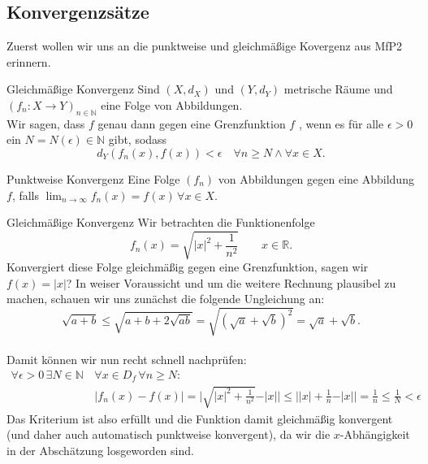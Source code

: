 \subsection{Konvergenzsätze}
Zuerst wollen wir uns an die punktweise und gleichmäßige Kovergenz aus MfP2 erinnern.
\begin{Def}
{Gleichmäßige Konvergenz}
Sind $(X,d_X)$ und $(Y,d_Y)$ metrische Räume und $(f_n:X\to Y)_{n\in\mathbb{N}}$ eine Folge von Abbildungen.\\
Wir sagen, dass $f$ genau dann  gegen eine Grenzfunktion $f$ , wenn es für alle $\epsilon>0$ ein $N=N(\epsilon)\in\mathbb{N}$ gibt, sodass
\begin{equation*}
    d_Y(f_n(x),f(x))<\epsilon\quad \forall n\geq N\land \forall x\in X.
\end{equation*}
\end{Def}
\begin{Def}
{Punktweise Konvergenz}
Eine Folge $(f_n)$ von Abbildungen  gegen eine Abbildung $f$, falls $\lim_{n\to\infty}f_n(x)=f(x)\,\forall x\in X$.
\end{Def}
\begin{Beispiel}
    {Gleichmäßige Konvergenz}
    Wir betrachten die Funktionenfolge
    \begin{equation*}
        f_n(x)=\sqrt{\vert x \vert^2 + \frac{1}{n^2}} \qquad x \in \mathbb{R}.
    \end{equation*}
    Konvergiert diese Folge gleichmäßig gegen eine Grenzfunktion, sagen wir $f(x)=\vert x \vert$? In weiser Voraussicht und um die weitere Rechnung plausibel zu machen, schauen wir uns zunächst die folgende Ungleichung an: 
    \begin{equation*}
        \sqrt{a+b} \leq \sqrt{a+b+2\sqrt{ab}} = \sqrt{(\sqrt{a}+\sqrt{b})^2}=\sqrt{a}+\sqrt{b}.
    \end{equation*} \\
    
    Damit können wir nun recht schnell nachprüfen:
    \begin{align*}
        \forall \epsilon > 0 \,\exists N\in\mathbb{N}\, &\forall x\in D_f \,\forall n\geq N: \\
            &\vert f_n(x)-f(x) \vert = \bigl| \sqrt{\vert x \vert^2 + \frac{1}{n^2}} - \vert x \vert \bigr| \leq \bigl| \vert x \vert + \frac{1}{n} - \vert x \vert \bigr| = \frac{1}{n} \leq \frac{1}{N} < \epsilon
    \end{align*}
    Das Kriterium ist also erfüllt und die Funktion damit gleichmäßig konvergent (und daher auch automatisch punktweise konvergent), da wir die $x$-Abhängigkeit in der Abschätzung losgeworden sind.
\end{Beispiel}
